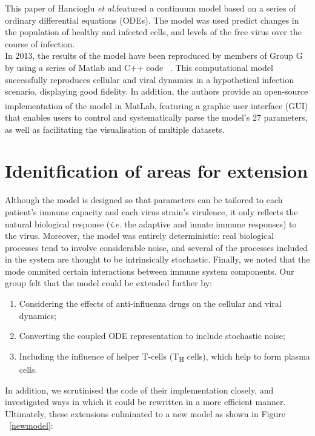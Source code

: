 \documentclass[a4paper, 12pt]{report}
\begin{document}
This paper of Hancioglu \textit{et al.}featured a continuum model based on a series of ordinary differential equations (ODEs). The model was used predict changes in the population of healthy and infected cells, and levels of the free virus over the course of infection. \\

In 2013, the results of the model have been reproduced by members of Group G by using a series of Matlab and C++ code ~\cite{GroupG}. This computational model successfully reproduces cellular and viral dynamics in a hypothetical infection scenario, displaying good fidelity. In addition, the authors provide an open-source implementation of the model in MatLab\textsuperscript{\textregistered}, featuring a graphic user interface (GUI) that enables users to control and systematically parse the model's 27 parameters, as well as facilitating the visualisation of multiple datasets. \\

\section{Idenitfication of areas for extension}

Although the model is designed so that parameters can be tailored to each patient's immune capacity and each virus strain's virulence, it only reflects the natural biological response (\textit{i.e.} the adaptive and innate immune responses) to the virus. Moreover, the model was entirely deterministic: real biological processes tend to involve considerable noise, and several of the processes included in the system are thought to be intrinsically stochastic. Finally, we noted that the mode ommited certain interactions between immune system components.
Our group felt that the model could be extended further by:
\begin{enumerate}
\item Considering the effects of anti-influenza drugs on the cellular and viral dynamics;
\item Converting the coupled ODE representation to include stochastic noise;
\item Including the influence of helper T-cells (T\textsubscript{H} cells), which help to form plasma cells.
\end{enumerate}
In addition, we scrutinised the code of their implementation closely, and investigated ways in which it could be rewritten in a more efficient manner. Ultimately, these extensions culminated to a new model as shown in Figure ~\ref{newmodel}:
\end{document}
